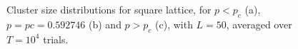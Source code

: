 \documentclass[11pt]{article}
\begin{document}
    \newpage
    \begin{figure}[H]
        \centering
        \bigskip
        \bigskip

        \caption{Cluster size distributions for square lattice, for $p < p_c$ (a), $p = p c = 0.592746$ (b)
            and $p > p_c$ (c), with $L = 50$, averaged over $T = 10^4$ trials.}
        \label{fig:seventh}
    \end{figure}
\end{document}
